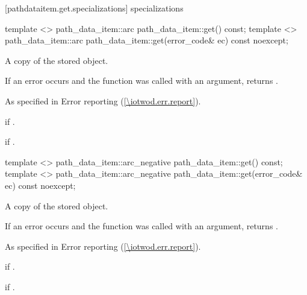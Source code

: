  [pathdataitem.get.specializations]{ specializations}

\begin{itemdecl}
template <>
path_data_item::arc path_data_item::get() const;
template <>
path_data_item::arc path_data_item::get(error_code& ec) const noexcept;
\end{itemdecl}
\begin{itemdescr}
\pnum
\returns
A copy of the stored  object.

\pnum
If an error occurs and the function was called with an  argument, returns .

\pnum
\throws
As specified in Error reporting (\ref{\iotwod.err.report}).

\pnum
\errors
{} if .

\pnum
{} if .
\end{itemdescr}

\begin{itemdecl}
template <>
path_data_item::arc_negative path_data_item::get() const;
template <>
path_data_item::arc_negative path_data_item::get(error_code& ec) const noexcept;
\end{itemdecl}
\begin{itemdescr}
\pnum
\returns
A copy of the stored  object.

\pnum
If an error occurs and the function was called with an  argument, returns .

\pnum
\throws
As specified in Error reporting (\ref{\iotwod.err.report}).

\pnum
\errors
{} if .

\pnum
{} if .
\end{itemdescr}

